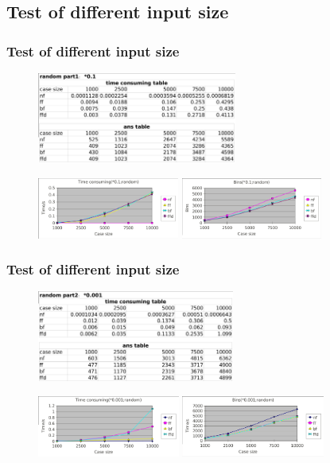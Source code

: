 \documentclass[slidestop,compress,mathserif,brown]{beamer}
\begin{document}
\begin{CJK}{UTF8}{kai}
\subsection{Test of different input size}
\begin{frame}
\frametitle{Test of different input size}
\begin{figure}
	\begin{center}
	\includegraphics[height = 3cm]{figures/1.png}
	\end{center}
	\begin{center}
	\includegraphics[height = 2cm]{figures/4.png}\quad
	\includegraphics[height = 2cm]{figures/7.png}
	\end{center}
\end{figure}
\end{frame}

\begin{frame}
\frametitle{Test of different input size}
\begin{figure}
	\begin{center}
	\includegraphics[height = 3cm]{figures/2.png}
	\end{center}
	\begin{center}
	\includegraphics[height = 2cm]{figures/5.png}\quad
	\includegraphics[height = 2cm]{figures/8.png}
	\end{center}
\end{figure}
\end{frame}


\end{CJK}
\end{document}
